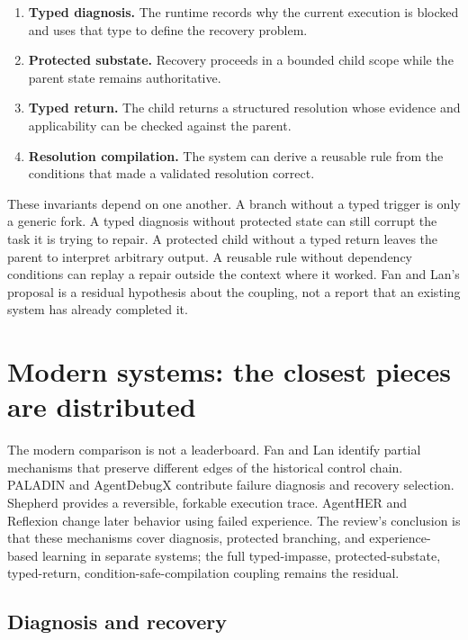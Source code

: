 \begin{enumerate}
  \item \textbf{Typed diagnosis.} The runtime records why the current execution is blocked and uses that type to define the recovery problem.
  \item \textbf{Protected substate.} Recovery proceeds in a bounded child scope while the parent state remains authoritative.
  \item \textbf{Typed return.} The child returns a structured resolution whose evidence and applicability can be checked against the parent.
  \item \textbf{Resolution compilation.} The system can derive a reusable rule from the conditions that made a validated resolution correct.
\end{enumerate}

These invariants depend on one another. A branch without a typed trigger is only a generic fork. A typed diagnosis without protected state can still corrupt the task it is trying to repair. A protected child without a typed return leaves the parent to interpret arbitrary output. A reusable rule without dependency conditions can replay a repair outside the context where it worked. Fan and Lan's proposal is a residual hypothesis about the coupling, not a report that an existing system has already completed it.

\section{Modern systems: the closest pieces are distributed}
\label{sec:ch13-modern-baselines}

The modern comparison is not a leaderboard. Fan and Lan identify partial mechanisms that preserve different edges of the historical control chain. PALADIN and AgentDebugX contribute failure diagnosis and recovery selection. Shepherd provides a reversible, forkable execution trace. AgentHER and Reflexion change later behavior using failed experience. The review's conclusion is that these mechanisms cover diagnosis, protected branching, and experience-based learning in separate systems; the full typed-impasse, protected-substate, typed-return, condition-safe-compilation coupling remains the residual.

\subsection{Diagnosis and recovery}

